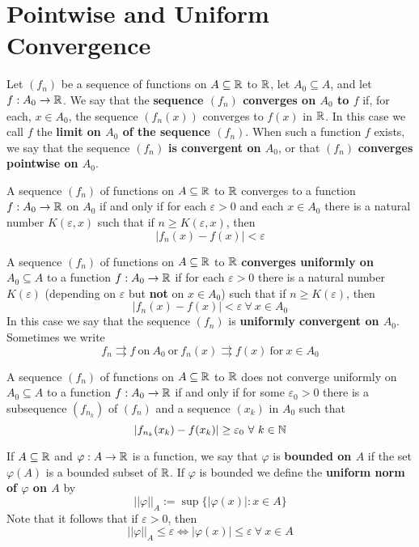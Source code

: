 \section{Pointwise and Uniform Convergence}

\begin{definition}
	Let $(f_n)$ be a sequence of functions on $A \subseteq \mathbb{R}$ to $\mathbb{R}$, let $A_0\subseteq A$, and let $f: A_0 \to \mathbb{R}$. We say that the \textbf{sequence $(f_n)$ converges on $A_0$ to $f$} if, for each, $x \in A_0$, the sequence $(f_n(x))$ converges to $f(x)$ in $\mathbb{R}$. In this case we call $f$ the \textbf{limit on $A_0$ of the sequence $(f_n)$}. When such a function $f$ exists, we say that the sequence $(f_n)$ \textbf{is convergent on $A_0$}, or that $(f_n)$ \textbf{converges pointwise on $A_0$}.
\end{definition}

\begin{lemma}
	A sequence $(f_n)$ of functions on $A \subseteq \mathbb{R}$ to $\mathbb{R}$ converges to a function $f:A_0 \to \mathbb{R}$ on $A_0$ if and only if for each $\varepsilon>0$ and each $x \in A_0$ there is a natural number $K(\varepsilon, x)$ such that if $n \geq K(\varepsilon, x)$, then
	\[|f_n(x)-f(x)|<\varepsilon\]
\end{lemma}

\begin{definition}
	A sequence $(f_n)$ of functions on $A \subseteq \mathbb{R}$ to $\mathbb{R}$ \textbf{converges uniformly on $A_0 \subseteq A$} to a function $f:A_0 \to \mathbb{R}$ if for each $\varepsilon >0$ there is a natural number $K(\varepsilon)$ (depending on $\varepsilon$ but \textbf{not} on $x \in A_0$) such that if $n \geq K(\varepsilon)$, then
	\[|f_n(x)-f(x)|<\varepsilon\ \forall\ x \in A_0\]
	In this case we say that the sequence $(f_n)$ is \textbf{uniformly convergent on $A_0$}. Sometimes we write
	\[f_n \rightrightarrows f\ \text{on}\ A_0\ \text{or}\ f_n(x)\rightrightarrows f(x)\ \text{for}\ x \in A_0\]
\end{definition}

\begin{lemma}
	A sequence $(f_n)$ of functions on $A \subseteq \mathbb{R}$ to $\mathbb{R}$ does not converge uniformly on $A_0 \subseteq A$ to a function $f:A_0 \to \mathbb{R}$ if and only if for some $\varepsilon_0 >0$ there is a subsequence $(f_{n_k})$ of $(f_n)$ and a sequence $(x_k)$ in $A_0$ such that
	\[|f_{n_k}(x_k)-f(x_k)|\geq\varepsilon_0\ \forall\ k \in \N\]
\end{lemma}

\begin{definition}
	If $A \subseteq \mathbb{R}$ and $\varphi : A \to \mathbb{R}$ is a function, we say that $\varphi$ is \textbf{bounded on $A$} if the set $\varphi(A)$ is a bounded subset of $\mathbb{R}$. If $\varphi$ is bounded we define the \textbf{uniform norm of $\varphi$ on $A$} by
	\[||\varphi||_A:=\sup\{|\varphi(x)|:x \in A\}\]
	Note that it follows that if $\varepsilon >0$, then
	\[||\varphi||_A \leq \varepsilon \iff |\varphi(x)|\leq \varepsilon\ \forall\ x \in A\]
\end{definition}

